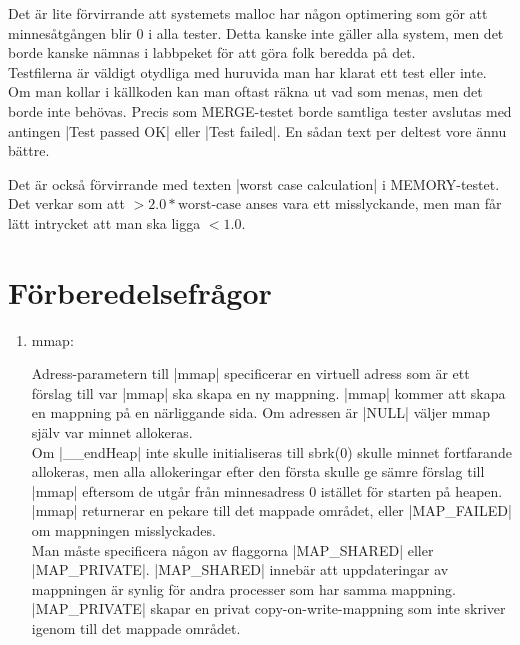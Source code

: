 \documentclass[paper=a4, fontsize=11pt]{scrartcl} %
\numberwithin{equation}{section} %
\numberwithin{figure}{section} %
\numberwithin{table}{section} %
\begin{document}
Det är lite förvirrande att systemets malloc har någon optimering som gör att
minnesåtgången blir 0 i alla tester. 
Detta kanske inte gäller alla system, men det borde kanske nämnas i labbpeket
för att göra folk beredda på det.\\

Testfilerna är väldigt otydliga med huruvida man har klarat ett test eller
inte. Om man kollar i källkoden kan man oftast räkna ut vad som menas, men det
borde inte behövas.
Precis som MERGE-testet borde samtliga tester avslutas med antingen
|Test passed OK| eller |Test failed|.
En sådan text per deltest vore ännu bättre. 

Det är också förvirrande med texten |worst case calculation| i MEMORY-testet.
Det verkar som att $> 2.0*\text{worst-case}$ anses vara ett misslyckande, men
man får lätt intrycket att man ska ligga $< 1.0$.


\section{Förberedelsefrågor}

\begin{enumerate}[1)]
\item{mmap:}

Adress-parametern till |mmap| specificerar en virtuell adress som är ett
förslag till var |mmap| ska skapa en ny mappning.
|mmap| kommer att skapa en mappning på en närliggande sida.
Om adressen är |NULL| väljer mmap själv var minnet allokeras.\\

Om |__endHeap| inte skulle initialiseras till sbrk(0) skulle minnet fortfarande
allokeras, men alla allokeringar efter den första skulle ge sämre förslag till
|mmap| eftersom de utgår från minnesadress 0 istället för starten på heapen.\\

|mmap| returnerar en pekare till det mappade området, eller |MAP_FAILED| om
mappningen misslyckades.\\

Man måste specificera någon av flaggorna |MAP_SHARED| eller |MAP_PRIVATE|.
|MAP_SHARED| innebär att uppdateringar av mappningen är synlig för andra
processer som har samma mappning.
|MAP_PRIVATE| skapar en privat copy-on-write-mappning som inte skriver igenom
till det mappade området.
\end{enumerate}

\end{document}
